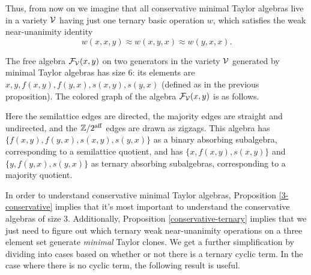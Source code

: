 \documentclass[letterpaper,11pt]{article}
\DeclareMathOperator{\aff}{aff}
\begin{document}
Thus, from now on we imagine that all conservative minimal Taylor algebras live in a variety $\mathcal{V}$ having just one ternary basic operation $w$, which satisfies the weak near-unanimity identity
\[
w(x,x,y) \approx w(x,y,x) \approx w(y,x,x).
\]

\begin{prop} The free algebra $\mathcal{F}_{\mathcal{V}}(x,y)$ on two generators in the variety $\mathcal{V}$ generated by minimal Taylor algebras has size $6$: its elements are $x, y, f(x,y), f(y,x), s(x,y), s(y,x)$ (defined as in the previous proposition). The colored graph of the algebra $\mathcal{F}_{\mathcal{V}}(x,y)$ is as follows.
\begin{center}
\end{center}
Here the semilattice edges are directed, the majority edges are straight and undirected, and the $\ZZ/2^{\aff}$ edges are drawn as zigzags. This algebra has $\{f(x,y), f(y,x), s(x,y), s(y,x)\}$ as a binary absorbing subalgebra, corresponding to a semilattice quotient, and has $\{x,f(x,y),s(x,y)\}$ and $\{y,f(y,x),s(y,x)\}$ as ternary absorbing subalgebras, corresponding to a majority quotient.
\end{prop}

In order to understand conservative minimal Taylor algebras, Proposition \ref{3-conservative} implies that it's most important to understand the conservative algebras of size $3$. Additionally, Proposition \ref{conservative-ternary} implies that we just need to figure out which ternary weak near-unanimity operations on a three element set generate \emph{minimal} Taylor clones. We get a further simplification by dividing into cases based on whether or not there is a ternary cyclic term. In the case where there is no cyclic term, the following result is useful.
\end{document}

